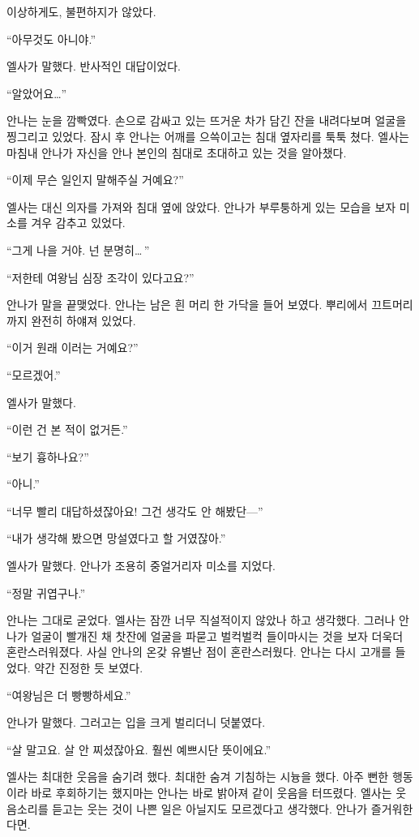 이상하게도, 불편하지가 않았다.

``아무것도 아니야.''

엘사가 말했다. 반사적인 대답이었다.

``알았어요\ldots''

안나는 눈을 깜빡였다. 손으로 감싸고 있는 뜨거운 차가 담긴 잔을 내려다보며 얼굴을 찡그리고 있었다. 잠시 후 안나는 어깨를 으쓱이고는 침대 옆자리를 툭툭 쳤다. 엘사는 마침내 안나가 자신을 안나 본인의 침대로 초대하고 있는 것을 알아챘다.

``이제 무슨 일인지 말해주실 거예요?''

엘사는 대신 의자를 가져와 침대 옆에 앉았다. 안나가 부루퉁하게 있는 모습을 보자 미소를 겨우 감추고 있었다.

``그게 나을 거야. 넌 분명히\ldots\,''

``저한테 여왕님 심장 조각이 있다고요?''

안나가 말을 끝맺었다. 안나는 남은 흰 머리 한 가닥을 들어 보였다. 뿌리에서 끄트머리까지 완전히 하얘져 있었다.

``이거 원래 이러는 거예요?''

``모르겠어.''

엘사가 말했다.

``이런 건 본 적이 없거든.''

``보기 흉하나요?''

``아니.''

``너무 빨리 대답하셨잖아요! 그건 생각도 안 해봤단—''

``내가 생각해 봤으면 망설였다고 할 거였잖아.''

엘사가 말했다. 안나가 조용히 중얼거리자 미소를 지었다.

``정말 귀엽구나.''

안나는 그대로 굳었다. 엘사는 잠깐 너무 직설적이지 않았나 하고 생각했다. 그러나 안나가 얼굴이 빨개진 채 찻잔에 얼굴을 파묻고 벌컥벌컥 들이마시는 것을 보자 더욱더 혼란스러워졌다. 사실 안나의 온갖 유별난 점이 혼란스러웠다. 안나는 다시 고개를 들었다. 약간 진정한 듯 보였다.

``여왕님은 더 빵빵하세요.''

안나가 말했다. 그러고는 입을 크게 벌리더니 덧붙였다.

``살 말고요. 살 안 찌셨잖아요. 훨씬 예쁘시단 뜻이에요.''

엘사는 최대한 웃음을 숨기려 했다. 최대한 숨겨 기침하는 시늉을 했다. 아주 뻔한 행동이라 바로 후회하기는 했지마는 안나는 바로 밝아져 같이 웃음을 터뜨렸다. 엘사는 웃음소리를 듣고는 웃는 것이 나쁜 일은 아닐지도 모르겠다고 생각했다. 안나가 즐거워한다면.

